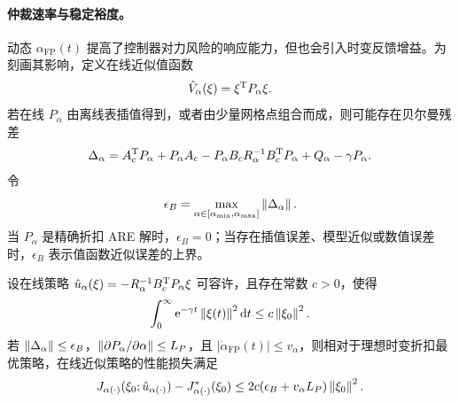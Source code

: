 \paragraph{仲裁速率与稳定裕度。}
\label{subsec:ch4_rate_margin}

动态 $\alpha_{\mathrm{FP}}(t)$ 提高了控制器对力风险的响应能力，但也会引入时变反馈增益。为刻画其影响，定义在线近似值函数
\begin{equation}
  \hat V_{\alpha}(\xi)=\xi^{\mathrm{T}}P_{\alpha}\xi .
  \label{eq:ch4_val_online}
\end{equation}
若在线 $P_{\alpha}$ 由离线表插值得到，或者由少量网格点组合而成，则可能存在贝尔曼残差
\begin{equation}
  \Delta_\alpha=A_c^{\mathrm{T}}P_\alpha+P_\alpha A_c-P_\alpha B_cR_\alpha^{-1}B_c^{\mathrm{T}}P_\alpha+Q_\alpha-\gamma P_\alpha .
  \label{eq:ch4_bellman_residual}
\end{equation}
令
\begin{equation}
  \epsilon_B=\max_{\alpha\in[\alpha_{\min},\alpha_{\max}]}\left\lVert \Delta_\alpha\right\rVert .
  \label{eq:ch4_eps_B}
\end{equation}
当 $P_\alpha$ 是精确折扣 ARE 解时，$\epsilon_B=0$；当存在插值误差、模型近似或数值误差时，$\epsilon_B$ 表示值函数近似误差的上界。

\begin{theorem}[时变优先级下的性能损失上界]
\label{thm:ch4_timevarying_performance}
设在线策略 $\hat u_\alpha(\xi)=-R_\alpha^{-1}B_c^{\mathrm{T}}P_\alpha\xi$ 可容许，且存在常数 $c>0$，使得
\begin{equation}
  \int_0^\infty \mathrm{e}^{-\gamma t}\left\lVert \xi(t)\right\rVert^2\mathrm{d} t\le c\left\lVert \xi_0\right\rVert^2 .
\end{equation}
若 $\left\lVert \Delta_\alpha\right\rVert\le\epsilon_B$，$\left\lVert \partial P_\alpha/\partial\alpha\right\rVert\le L_P$，且 $|\dot\alpha_{\mathrm{FP}}(t)|\le v_\alpha$，则相对于理想时变折扣最优策略，在线近似策略的性能损失满足
\begin{equation}
  J_{\alpha(\cdot)}(\xi_0;\hat u_{\alpha(\cdot)})-J_{\alpha(\cdot)}^*(\xi_0)
  \le 2c(\epsilon_B+v_\alpha L_P)\left\lVert \xi_0\right\rVert^2 .
  \label{eq:ch4_perf_loss}
\end{equation}
\end{theorem}

